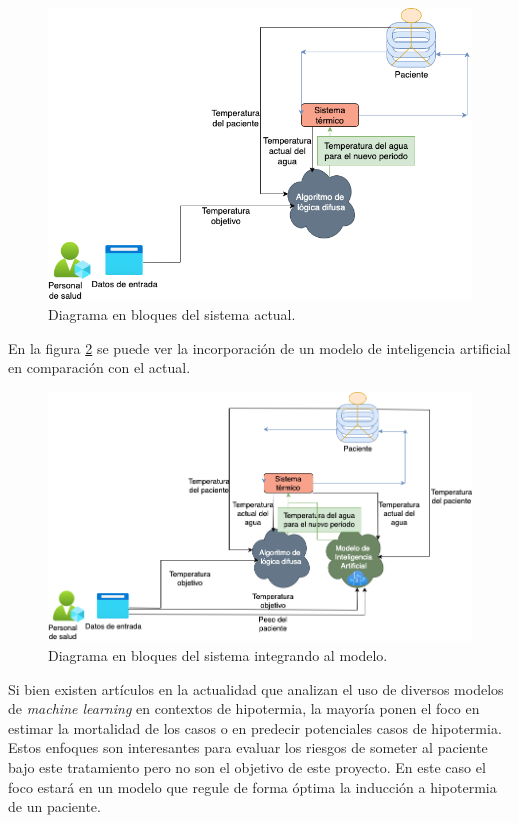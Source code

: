 \documentclass[
11pt, %
]{charter}
\begin{document}
\begin{figure}[htpb]
	\centering 
	\includegraphics[width=.95\textwidth]{./Figuras/amrra-diagrama1.png}
	\caption{Diagrama en bloques del sistema actual.}
	\label{fig:diagBloquesActual}
\end{figure}

En la figura  \ref{fig:diagBloquesFuturo} se puede ver la incorporación de un modelo de inteligencia artificial en comparación con el actual.

\begin{figure}[htpb]
	\centering 
	\includegraphics[width=.95\textwidth]{./Figuras/amrra-diagrama2.png}
	\caption{Diagrama en bloques del sistema integrando al modelo.}
	\label{fig:diagBloquesFuturo}
\end{figure}

Si bien existen artículos en la actualidad que analizan el uso de diversos modelos de \textit{machine learning} en contextos de hipotermia, la mayoría ponen el foco en estimar la mortalidad de los casos o en predecir potenciales casos de hipotermia. Estos enfoques son interesantes para evaluar los riesgos de someter al paciente bajo este tratamiento pero no son el objetivo de este proyecto. En este caso el foco estará en un modelo que regule de forma óptima la inducción a hipotermia de un paciente.
\end{document}
